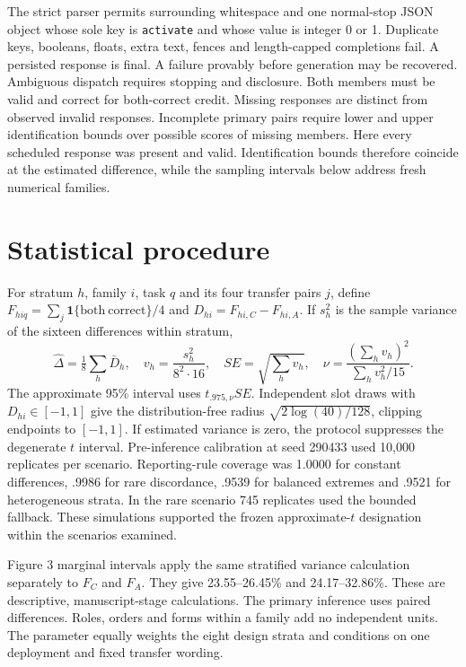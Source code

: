The strict parser permits surrounding whitespace and one normal-stop JSON object whose sole key is \texttt{activate} and whose value is integer 0 or 1. Duplicate keys, booleans, floats, extra text, fences and length-capped completions fail. A persisted response is final. A failure provably before generation may be recovered. Ambiguous dispatch requires stopping and disclosure. Both members must be valid and correct for both-correct credit. Missing responses are distinct from observed invalid responses. Incomplete primary pairs require lower and upper identification bounds over possible scores of missing members. Here every scheduled response was present and valid. Identification bounds therefore coincide at the estimated difference, while the sampling intervals below address fresh numerical families.

\section{Statistical procedure}
For stratum $h$, family $i$, task $q$ and its four transfer pairs $j$, define $F_{hiq}=\sum_j\mathbf1\{\mathrm{both\ correct}\}/4$ and $D_{hi}=F_{hi,C}-F_{hi,A}$. If $s_h^2$ is the sample variance of the sixteen differences within stratum,
\[
 \widehat{\Delta}=\tfrac18\sum_h\bar D_h,\quad
 v_h=\frac{s_h^2}{8^2\cdot16},\quad
 SE=\sqrt{\sum_hv_h},\quad
 \nu=\frac{(\sum_hv_h)^2}{\sum_hv_h^2/15}.
\]
The approximate 95\% interval uses $t_{.975,\nu}SE$. Independent slot draws with $D_{hi}\in[-1,1]$ give the distribution-free radius $\sqrt{2\log(40)/128}$, clipping endpoints to $[-1,1]$. If estimated variance is zero, the protocol suppresses the degenerate $t$ interval. Pre-inference calibration at seed 290433 used 10,000 replicates per scenario. Reporting-rule coverage was 1.0000 for constant differences, .9986 for rare discordance, .9539 for balanced extremes and .9521 for heterogeneous strata. In the rare scenario 745 replicates used the bounded fallback. These simulations supported the frozen approximate-$t$ designation within the scenarios examined.

Figure 3 marginal intervals apply the same stratified variance calculation separately to $F_C$ and $F_A$. They give 23.55--26.45\% and 24.17--32.86\%. These are descriptive, manuscript-stage calculations. The primary inference uses paired differences. Roles, orders and forms within a family add no independent units. The parameter equally weights the eight design strata and conditions on one deployment and fixed transfer wording.

